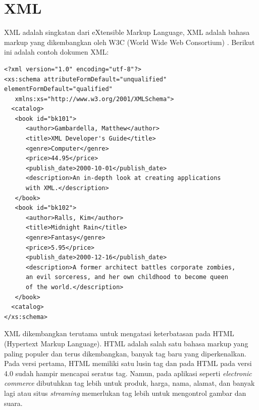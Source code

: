 \section{XML}
XML adalah singkatan dari eXtensible Markup Language, XML adalah bahasa markup 
yang dikembangkan oleh W3C (World Wide Web Consortium)
\cite{Benoit:2000}. Berikut ini adalah contoh dokumen XML:
\lstset{basicstyle=\normalsize}
\begin{lstlisting}
<?xml version="1.0" encoding="utf-8"?>
<xs:schema attributeFormDefault="unqualified" elementFormDefault="qualified"
   xmlns:xs="http://www.w3.org/2001/XMLSchema">
  <catalog>
   <book id="bk101">
      <author>Gambardella, Matthew</author>
      <title>XML Developer's Guide</title>
      <genre>Computer</genre>
      <price>44.95</price>
      <publish_date>2000-10-01</publish_date>
      <description>An in-depth look at creating applications 
      with XML.</description>
   </book>
   <book id="bk102">
      <author>Ralls, Kim</author>
      <title>Midnight Rain</title>
      <genre>Fantasy</genre>
      <price>5.95</price>
      <publish_date>2000-12-16</publish_date>
      <description>A former architect battles corporate zombies, 
      an evil sorceress, and her own childhood to become queen 
      of the world.</description>
   </book>
  <catalog>
</xs:schema>
\end{lstlisting}
XML dikembangkan terutama 
untuk mengatasi keterbatasan pada HTML (Hypertext Markup Language). HTML adalah 
salah satu bahasa markup yang paling populer dan terus dikembangkan, banyak tag baru 
yang diperkenalkan. Pada versi pertama, HTML memiliki satu lusin tag dan pada
HTML pada versi 4.0 sudah hampir mencapai seratus tag. Namun, pada aplikasi
seperti \textit{electronic commerce} dibutuhkan tag lebih untuk produk, harga, nama,
alamat, dan banyak lagi atau situs \textit{streaming} memerlukan tag lebih untuk
mengontrol gambar dan suara.
\lstset{language=XML}

